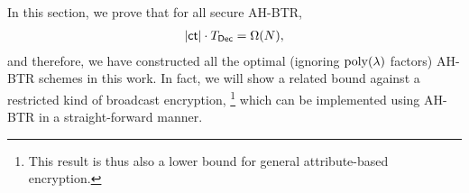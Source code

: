 In this section, we prove that for all secure AH-BTR,
\begin{align*}
|\ct|\cdot\TDec=\Omega(N),
\end{align*}
and therefore, we have constructed all the optimal (ignoring $\operatorname{poly}(\lambda)$ factors) AH-BTR schemes in this work.
In fact, we will show a related bound against a restricted kind of broadcast encryption,%
\footnote{This result is thus also a lower bound for general attribute-based encryption.}
which can be implemented using AH-BTR in a straight-forward manner.
